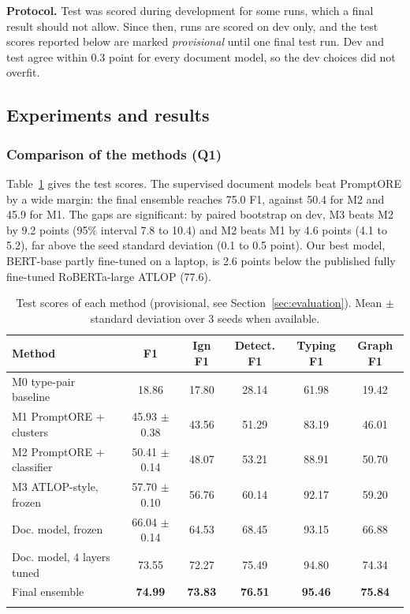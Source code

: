 \documentclass[pdflatex,sn-mathphys-num]{sn-jnl}
\begin{document}
\textbf{Protocol.} Test was scored during development for some runs, which a final result should not allow. Since then, runs are scored on dev only, and the test scores reported below are marked \emph{provisional} until one final test run. Dev and test agree within 0.3 point for every document model, so the dev choices did not overfit.

\subsection{Experiments and results}\label{sec:results}

\subsubsection{Comparison of the methods (Q1)}

Table~\ref{tab:main} gives the test scores. The supervised document models beat PromptORE by a wide margin: the final ensemble reaches 75.0 F1, against 50.4 for M2 and 45.9 for M1. The gaps are significant: by paired bootstrap on dev, M3 beats M2 by 9.2 points (95\% interval 7.8 to 10.4) and M2 beats M1 by 4.6 points (4.1 to 5.2), far above the seed standard deviation (0.1 to 0.5 point). Our best model, BERT-base partly fine-tuned on a laptop, is 2.6 points below the published fully fine-tuned RoBERTa-large ATLOP (77.6).

\begin{table}[htbp]
\caption{Test scores of each method (provisional, see Section~\ref{sec:evaluation}). Mean $\pm$ standard deviation over 3 seeds when available.}\label{tab:main}
\centering
\begin{tabular}{@{}lccccc@{}}
\toprule
Method & F1 & Ign F1 & Detect. F1 & Typing F1 & Graph F1 \\
\midrule
M0 type-pair baseline & 18.86 & 17.80 & 28.14 & 61.98 & 19.42 \\
M1 PromptORE + clusters & 45.93 $\pm$ 0.38 & 43.56 & 51.29 & 83.19 & 46.01 \\
M2 PromptORE + classifier & 50.41 $\pm$ 0.14 & 48.07 & 53.21 & 88.91 & 50.70 \\
M3 ATLOP-style, frozen & 57.70 $\pm$ 0.10 & 56.76 & 60.14 & 92.17 & 59.20 \\
Doc. model, frozen & 66.04 $\pm$ 0.14 & 64.53 & 68.45 & 93.15 & 66.88 \\
Doc. model, 4 layers tuned & 73.55 & 72.27 & 75.49 & 94.80 & 74.34 \\
Final ensemble & \textbf{74.99} & \textbf{73.83} & \textbf{76.51} & \textbf{95.46} & \textbf{75.84} \\
\botrule
\end{tabular}
\end{table}
\end{document}
